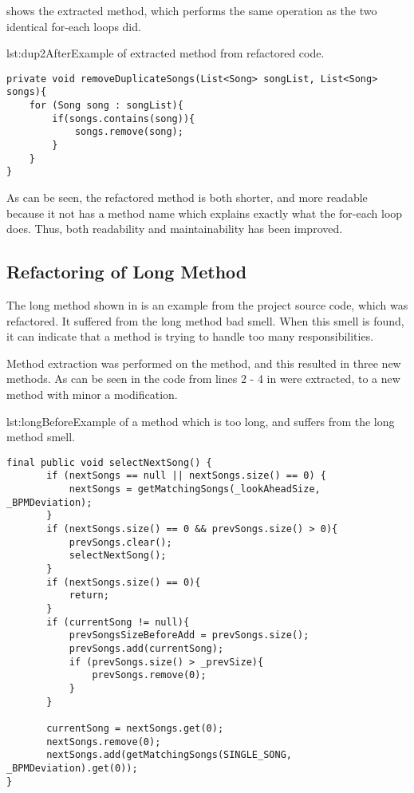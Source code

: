  shows the extracted method, which performs the same operation as the two identical for-each loops did.

\begin{code}{lst:dup2After}{Example of extracted method from refactored code.}
\begin{lstlisting}
private void removeDuplicateSongs(List<Song> songList, List<Song> songs){
    for (Song song : songList){
        if(songs.contains(song)){
            songs.remove(song);
        }
    }
}
\end{lstlisting}
\end{code}

As can be seen, the refactored method is both shorter, and more readable because it not has a method name which explains exactly what the for-each loop does. Thus, both readability and maintainability has been improved.
\subsection{Refactoring of Long Method}
The long method shown in  is an example from the project source code, which was refactored. It suffered from the long method bad smell. When this smell is found, it can indicate that a method is trying to handle too many responsibilities. 

Method extraction was performed on the method, and this resulted in three new methods. As can be seen in  the code from lines 2 - 4 in 
 were extracted, to a new method with minor a modification. 

\begin{code}{lst:longBefore}{Example of a method which is too long, and suffers from the long method smell.}
\begin{lstlisting}
final public void selectNextSong() {
       if (nextSongs == null || nextSongs.size() == 0) {
           nextSongs = getMatchingSongs(_lookAheadSize, _BPMDeviation);
       }
       if (nextSongs.size() == 0 && prevSongs.size() > 0){
           prevSongs.clear();
           selectNextSong();
       }
       if (nextSongs.size() == 0){
           return; 
       }
       if (currentSong != null){
           prevSongsSizeBeforeAdd = prevSongs.size();
           prevSongs.add(currentSong);
           if (prevSongs.size() > _prevSize){
               prevSongs.remove(0);
           }
       }

       currentSong = nextSongs.get(0);
       nextSongs.remove(0);
       nextSongs.add(getMatchingSongs(SINGLE_SONG, _BPMDeviation).get(0));
}
\end{lstlisting}
\end{code}


